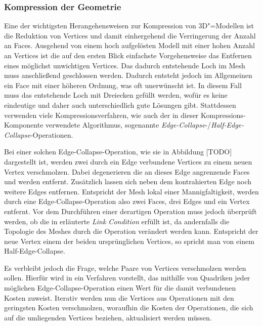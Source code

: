 \subsubsection{Kompression der Geometrie}
\label{schlenke:chp:fundamentals:geocomp}

Eine der wichtigsten Herangehensweisen zur Kompression von 3D"=Modellen ist die Reduktion von Vertices und damit einhergehend die Verringerung der Anzahl an Faces. Ausgehend von einem hoch aufgelösten Modell mit einer hohen Anzahl an Vertices ist die auf den ersten Blick einfachste Vorgehensweise das Entfernen eines möglichst unwichtigen Vertices. Das dadurch entstehende Loch im Mesh muss anschließend geschlossen werden. Dadurch entsteht jedoch im Allgemeinen ein Face mit einer höheren Ordnung, was oft unerwünscht ist. In diesem Fall muss das entstehende Loch mit Dreiecken gefüllt werden, wofür es keine eindeutige und daher auch unterschiedlich gute Lösungen gibt. Stattdessen verwenden viele Kompressionsverfahren, wie auch der in dieser Kompressions-Komponente verwendete Algorithmus, sogenannte \emph{Edge-Collapse}-/\emph{Half-Edge-Collapse}-Operationen.

Bei einer solchen Edge-Collapse-Operation, wie sie in Abbildung [TODO] dargestellt ist, werden zwei durch ein Edge verbundene Vertices zu einem neuen Vertex verschmolzen. Dabei degenerieren die an dieses Edge angrenzende Faces und werden entfernt. Zusätzlich lassen sich neben dem kontrahierten Edge noch weitere Edges entfernen. Entspricht der Mesh lokal einer Mannigfaltigkeit, werden durch eine Edge-Collapse-Operation also zwei Faces, drei Edges und ein Vertex entfernt. Vor dem Durchführen einer derartigen Operation muss jedoch überprüft werden, ob die in \cite[S.~118f]{botsch2010} erläuterte \emph{Link Condition} erfüllt ist, da andernfalls die Topologie des Meshes durch die Operation verändert werden kann. Entspricht der neue Vertex einem der beiden ursprünglichen Vertices, so spricht man von einem Half-Edge-Collapse.

Es verbleibt jedoch die Frage, welche Paare von Vertices verschmolzen werden sollen. Hierfür wird in \cite{garland1997} ein Verfahren vorstellt, das mithilfe von Quadriken jeder möglichen Edge-Collapse-Operation einen Wert für die damit verbundenen Kosten zuweist. Iterativ werden nun die Vertices aus Operationen mit den geringsten Kosten verschmolzen, woraufhin die Kosten der Operationen, die sich auf die umliegenden Vertices beziehen, aktualisiert werden müssen.

